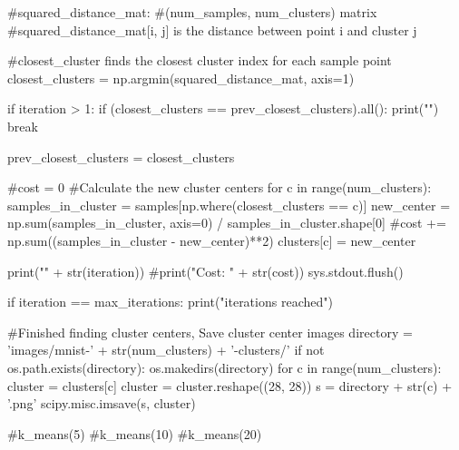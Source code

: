 \documentclass{article}
\begin{document}
\begin{python}
        #squared_distance_mat:
        #(num_samples, num_clusters) matrix
        #squared_distance_mat[i, j] is the distance between point i and cluster j

        #closest_cluster finds the closest cluster index for each sample point
        closest_clusters = np.argmin(squared_distance_mat, axis=1)

        if iteration > 1:
            if (closest_clusters == prev_closest_clusters).all():
                print("\nConverged")
                break

        prev_closest_clusters = closest_clusters

        #cost = 0
        #Calculate the new cluster centers
        for c in range(num_clusters):
            samples_in_cluster = samples[np.where(closest_clusters == c)]
            new_center = np.sum(samples_in_cluster, axis=0) / samples_in_cluster.shape[0]
            #cost += np.sum((samples_in_cluster - new_center)**2)
            clusters[c] = new_center

        print("\nIteration " + str(iteration))
        #print("Cost: " + str(cost))
        sys.stdout.flush()

    if iteration == max_iterations:
        print("\nMaximum iterations reached")

    #Finished finding cluster centers, Save cluster center images
    directory = 'images/mnist-' + str(num_clusters) + '-clusters/'
    if not os.path.exists(directory):
        os.makedirs(directory)
    for c in range(num_clusters):
        cluster = clusters[c]
        cluster = cluster.reshape((28, 28))
        s = directory + str(c) + '.png'
        scipy.misc.imsave(s, cluster)

#k_means(5)
#k_means(10)
#k_means(20)
\end{python}
\newpage
\end{document}

